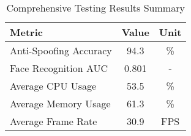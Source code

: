 \begin{table}[htbp]
\centering
\caption{Comprehensive Testing Results Summary}
\label{tab:comprehensive_results}
\begin{tabular}{|l|c|c|}
\hline
\textbf{Metric} & \textbf{Value} & \textbf{Unit} \\
\hline
Anti-Spoofing Accuracy & 94.3 & \% \\
Face Recognition AUC & 0.801 & - \\
Average CPU Usage & 53.5 & \% \\
Average Memory Usage & 61.3 & \% \\
Average Frame Rate & 30.9 & FPS \\
\hline
\end{tabular}
\end{table}